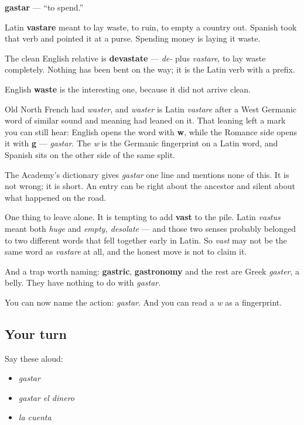 \begin{cousinweb}
\textbf{gastar} — \textquotedblleft{}to spend.\textquotedblright{}

Latin \textbf{vastare} meant to lay waste, to ruin, to empty a country out. Spanish took that verb and pointed it at a purse. Spending money is laying it waste.

The clean English relative is \textbf{devastate} — \emph{de-} plus \emph{vastare}, to lay waste completely. Nothing has been bent on the way; it is the Latin verb with a prefix.

English \textbf{waste} is the interesting one, because it did not arrive clean.

Old North French had \emph{waster}, and \emph{waster} is Latin \emph{vastare} after a West Germanic word of similar sound and meaning had leaned on it. That leaning left a mark you can still hear: English opens the word with \textbf{w}, while the Romance side opens it with \textbf{g} — \emph{gastar}. The \emph{w} is the Germanic fingerprint on a Latin word, and Spanish sits on the other side of the same split.

The Academy's dictionary gives \emph{gastar} one line and mentions none of this. It is not wrong; it is short. An entry can be right about the ancestor and silent about what happened on the road.

One thing to leave alone. It is tempting to add \textbf{vast} to the pile. Latin \emph{vastus} meant both \emph{huge} and \emph{empty, desolate} — and those two senses probably belonged to two different words that fell together early in Latin. So \emph{vast} may not be the same word as \emph{vastare} at all, and the honest move is not to claim it.

And a trap worth naming: \textbf{gastric}, \textbf{gastronomy} and the rest are Greek \emph{gaster}, a belly. They have nothing to do with \emph{gastar}.
\end{cousinweb}

\begin{grammarlens}[title={What you've built}]
You can now name the action: \emph{gastar}. And you can read a \emph{w} as a fingerprint.
\end{grammarlens}

\subsection*{Your turn}
Say these aloud:

\begin{itemize}
\raggedright
  \item \emph{gastar}
  \item \emph{gastar el dinero}
  \item \emph{la cuenta}
\end{itemize}

